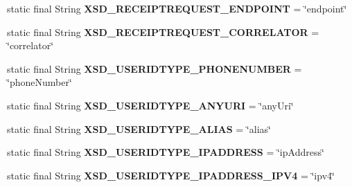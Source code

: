 \begin{DoxyCompactItemize}
\item 
\hypertarget{classcom_1_1bluevia_1_1commons_1_1parser_1_1xml_1_1XmlConstants_aaa2faf7babc2c11f983dbc4f561864fd}{
static final String {\bfseries XSD\_\-RECEIPTREQUEST\_\-ENDPOINT} = \char`\"{}endpoint\char`\"{}}
\label{classcom_1_1bluevia_1_1commons_1_1parser_1_1xml_1_1XmlConstants_aaa2faf7babc2c11f983dbc4f561864fd}

\item 
\hypertarget{classcom_1_1bluevia_1_1commons_1_1parser_1_1xml_1_1XmlConstants_a6d44d62a4f2ecbda846f767e1db4b698}{
static final String {\bfseries XSD\_\-RECEIPTREQUEST\_\-CORRELATOR} = \char`\"{}correlator\char`\"{}}
\label{classcom_1_1bluevia_1_1commons_1_1parser_1_1xml_1_1XmlConstants_a6d44d62a4f2ecbda846f767e1db4b698}

\item 
\hypertarget{classcom_1_1bluevia_1_1commons_1_1parser_1_1xml_1_1XmlConstants_a1340eb4c4edb96307e7ed4d9d05c64d8}{
static final String {\bfseries XSD\_\-USERIDTYPE\_\-PHONENUMBER} = \char`\"{}phoneNumber\char`\"{}}
\label{classcom_1_1bluevia_1_1commons_1_1parser_1_1xml_1_1XmlConstants_a1340eb4c4edb96307e7ed4d9d05c64d8}

\item 
\hypertarget{classcom_1_1bluevia_1_1commons_1_1parser_1_1xml_1_1XmlConstants_a7db5f497b84ee62f46d43aa12425b6c8}{
static final String {\bfseries XSD\_\-USERIDTYPE\_\-ANYURI} = \char`\"{}anyUri\char`\"{}}
\label{classcom_1_1bluevia_1_1commons_1_1parser_1_1xml_1_1XmlConstants_a7db5f497b84ee62f46d43aa12425b6c8}

\item 
\hypertarget{classcom_1_1bluevia_1_1commons_1_1parser_1_1xml_1_1XmlConstants_a4282d3157f7654f6f1e2f8e58dd09f4e}{
static final String {\bfseries XSD\_\-USERIDTYPE\_\-ALIAS} = \char`\"{}alias\char`\"{}}
\label{classcom_1_1bluevia_1_1commons_1_1parser_1_1xml_1_1XmlConstants_a4282d3157f7654f6f1e2f8e58dd09f4e}

\item 
\hypertarget{classcom_1_1bluevia_1_1commons_1_1parser_1_1xml_1_1XmlConstants_a51e696219c69439b156662ae10f0d8ad}{
static final String {\bfseries XSD\_\-USERIDTYPE\_\-IPADDRESS} = \char`\"{}ipAddress\char`\"{}}
\label{classcom_1_1bluevia_1_1commons_1_1parser_1_1xml_1_1XmlConstants_a51e696219c69439b156662ae10f0d8ad}

\item 
\hypertarget{classcom_1_1bluevia_1_1commons_1_1parser_1_1xml_1_1XmlConstants_ac84e978cb0eaf79016c0720f03019f80}{
static final String {\bfseries XSD\_\-USERIDTYPE\_\-IPADDRESS\_\-IPV4} = \char`\"{}ipv4\char`\"{}}
\label{classcom_1_1bluevia_1_1commons_1_1parser_1_1xml_1_1XmlConstants_ac84e978cb0eaf79016c0720f03019f80}


\end{DoxyCompactItemize}
